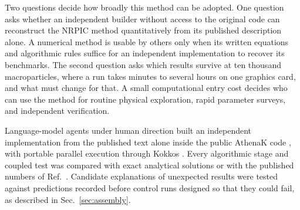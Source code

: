 Two questions decide how broadly this method can be adopted. One question asks whether an independent builder without access to the original code can reconstruct the NRPIC method quantitatively from its published description alone. A numerical method is usable by others only when its written equations and algorithmic rules suffice for an independent implementation to recover its benchmarks. The second question asks which results survive at ten thousand macroparticles, where a run takes minutes to several hours on one graphics card, and what must change for that. A small computational entry cost decides who can use the method for routine physical exploration, rapid parameter surveys, and independent verification.

Language-model agents under human direction built an independent implementation from the published text alone inside the public AthenaK code \cite{2026ApJS..283...27S,Zhu:2024utz}, with portable parallel execution through Kokkos \cite{2022ITPDS..33..805T}. Every algorithmic stage and coupled test was compared with exact analytical solutions or with the published numbers of Ref.~\cite{Wu:2026nrpic}. Candidate explanations of unexpected results were tested against predictions recorded before control runs designed so that they could fail, as described in Sec.~\ref{sec:assembly}.


